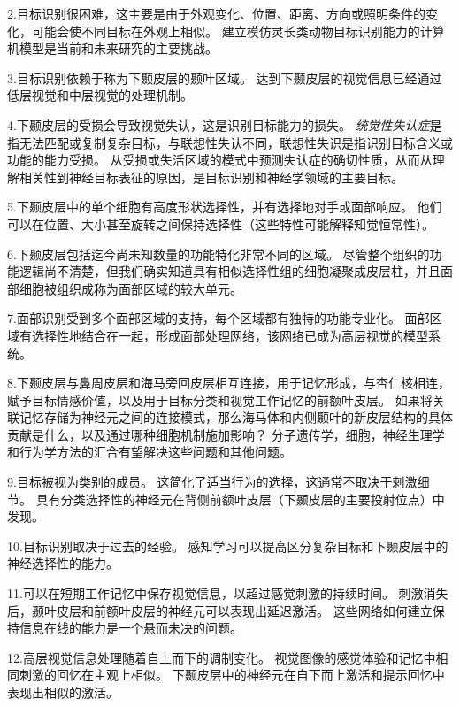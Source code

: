2.目标识别很困难，这主要是由于外观变化、位置、距离、方向或照明条件的变化，可能会使不同目标在外观上相似。
建立模仿灵长类动物目标识别能力的计算机模型是当前和未来研究的主要挑战。


3.目标识别依赖于称为下颞皮层的颞叶区域。
达到下颞皮层的视觉信息已经通过低层视觉和中层视觉的处理机制。


4.下颞皮层的受损会导致视觉失认，这是识别目标能力的损失。
\textit{统觉性失认症}是指无法匹配或复制复杂目标，与联想性失认不同，联想性失识是指识别目标含义或功能的能力受损。
从受损或失活区域的模式中预测失认症的确切性质，从而从理解相关性到神经目标表征的原因，是目标识别和神经学领域的主要目标。 


5.下颞皮层中的单个细胞有高度形状选择性，并有选择地对手或面部响应。
他们可以在位置、大小甚至旋转之间保持选择性（这些特性可能解释知觉恒常性）。


6.下颞皮层包括迄今尚未知数量的功能特化非常不同的区域。
尽管整个组织的功能逻辑尚不清楚，但我们确实知道具有相似选择性组的细胞凝聚成皮层柱，并且面部细胞被组织成称为面部区域的较大单元。


7.面部识别受到多个面部区域的支持，每个区域都有独特的功能专业化。
面部区域有选择性地结合在一起，形成面部处理网络，该网络已成为高层视觉的模型系统。


8.下颞皮层与鼻周皮层和海马旁回皮层相互连接，用于记忆形成，与杏仁核相连，赋予目标情感价值，以及用于目标分类和视觉工作记忆的前额叶皮层。
如果将关联记忆存储为神经元之间的连接模式，那么海马体和内侧颞叶的新皮层结构的具体贡献是什么，以及通过哪种细胞机制施加影响？
分子遗传学，细胞，神经生理学和行为学方法的汇合有望解决这些问题和其他问题。


9.目标被视为类别的成员。
这简化了适当行为的选择，这通常不取决于刺激细节。
具有分类选择性的神经元在背侧前额叶皮层（下颞皮层的主要投射位点）中发现。


10.目标识别取决于过去的经验。
感知学习可以提高区分复杂目标和下颞皮层中的神经选择性的能力。


11.可以在短期工作记忆中保存视觉信息，以超过感觉刺激的持续时间。
刺激消失后，颞叶皮层和前额叶皮层的神经元可以表现出延迟激活。
这些网络如何建立保持信息在线的能力是一个悬而未决的问题。


12.高层视觉信息处理随着自上而下的调制变化。
视觉图像的感觉体验和记忆中相同刺激的回忆在主观上相似。
下颞皮层中的神经元在自下而上激活和提示回忆中表现出相似的激活。


